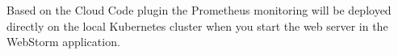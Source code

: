 Based on the Cloud Code plugin the Prometheus monitoring will be deployed directly on the local Kubernetes cluster when you start the web server in the WebStorm application.




